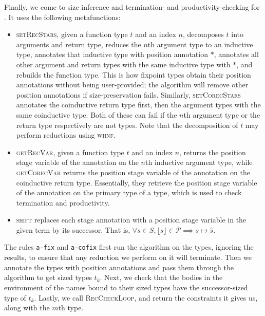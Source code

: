 \documentclass[sigplan,10pt,anonymous,review,nonacm]{acmart}
\begin{document}
Finally, we come to size inference and termination- and productivity-checking for \cofixpoints. It uses the following metafunctions:
\begin{itemize}
    \item \textsc{setRecStars}, given a function type $t$ and an index $n$, decomposes $t$ into arguments and return type, reduces the $n$th argument type to an inductive type, annotates that inductive type with position annotation $*$, annotates all other argument and return types with the same inductive type with $*$, and rebuilds the function type. This is how fixpoint types obtain their position annotations without being user-provided; the algorithm will remove other position annotations if size-preservation fails. Similarly, \textsc{setCorecStars} annotates the coinductive return type first, then the argument types with the same coinductive type. Both of these can fail if the $n$th argument type or the return type respectively are not \coinductive types. Note that the decomposition of $t$ may perform reductions using \textsc{whnf}.
    \item \textsc{getRecVar}, given a function type $t$ and an index $n$, returns the position stage variable of the annotation on the $n$th inductive argument type, while \textsc{getCorecVar} returns the position stage variable of the annotation on the coinductive return type. Essentially, they retrieve the position stage variable of the annotation on the primary \corecursive type of a \cofixpoint type, which is used to check termination and productivity.
    \item \textsc{shift} replaces each stage annotation with a position stage variable in the given term by its successor. That is, $\forall s \in S, \lfloor s \rfloor \in \mathcal{P} \implies s \mapsto \hat{s}$.
\end{itemize}

The rules \texttt{a-fix} and \texttt{a-cofix} first run the algorithm on the \cofixpoint types, ignoring the results, to ensure that any reduction we perform on it will terminate. Then we annotate the types with position annotations and pass them through the algorithm to get sized types $t_k$. Next, we check that the \cofixpoint bodies in the environment of the \cofixpoint names bound to their sized types have the successor-sized type of $t_k$. Lastly, we call \textsc{RecCheckLoop}, and return the constraints it gives us, along with the $m$th \cofixpoint type.


\end{document}
